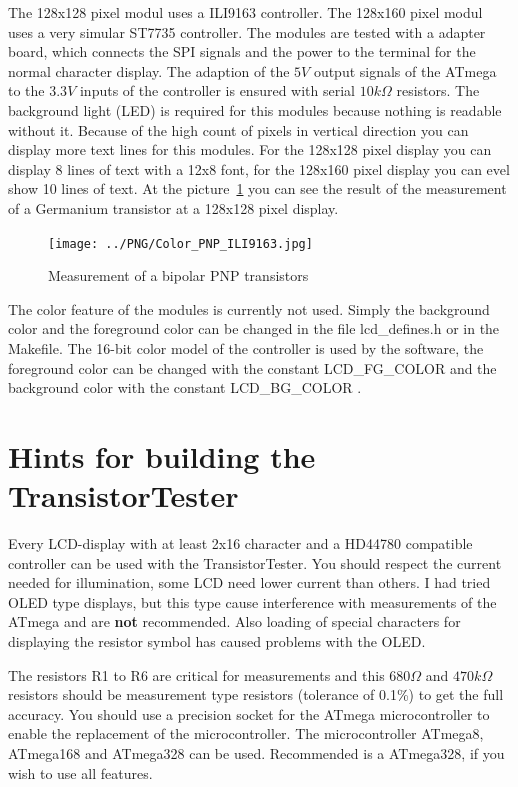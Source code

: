 The 128x128 pixel modul uses a ILI9163 controller.
The 128x160 pixel modul uses a very simular ST7735 controller.
The modules are tested with a adapter board, which connects the
SPI signals and the power to the terminal for the normal character display.
The adaption of the \(5V\) output signals of the ATmega to the \(3.3V\) inputs of the controller
is ensured with serial \(10k\Omega\) resistors.
The background light (LED) is required for this modules because nothing is readable without it.
Because of the high count of pixels in vertical direction you can display more text lines for this modules.
For the 128x128 pixel display you can display 8 lines of text with a 12x8 font,
for the 128x160 pixel display you can evel show 10 lines of text.
At the picture~\ref{fig:Color_PNP} you can see the result of the measurement of a Germanium transistor
at a 128x128 pixel display.

\begin{figure}[H]
\centering
\texttt{[image: ../PNG/Color\_PNP\_ILI9163.jpg]}
\caption{Measurement of a bipolar PNP transistors}
\label{fig:Color_PNP}
\end{figure}

The color feature of the modules is currently not used.
Simply the background color and the foreground color can be changed in the file lcd\_defines.h or
in the Makefile.
The 16-bit color model of the controller is used by the software, the foreground color can be changed
with the constant LCD\_FG\_COLOR and the background color with the constant LCD\_BG\_COLOR .


\section{Hints for building the TransistorTester}
Every LCD-display with at least 2x16 character and a HD44780 compatible controller
can be used with the TransistorTester. You should respect the current needed for
illumination, some LCD need lower current than others.
I had tried OLED type displays, but this type cause interference with measurements
of the ATmega and are \textbf {not} recommended. Also loading of special characters
for displaying the resistor symbol has caused problems with the OLED.

The resistors R1 to R6 are critical for measurements and this \(680\Omega\) and
\(470k\Omega\) resistors should be measurement type resistors (tolerance of 0.1\%) to
get the full accuracy.
You should use a precision socket for the ATmega microcontroller to enable
the replacement of the microcontroller.
The microcontroller ATmega8, ATmega168 and ATmega328 can be used.
Recommended is a ATmega328, if you wish to use all features.

